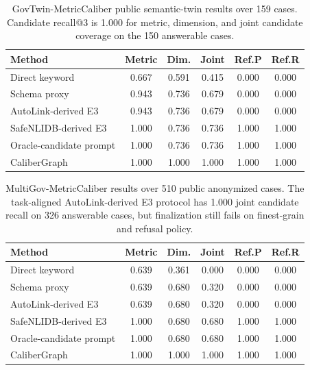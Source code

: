 \documentclass[letterpaper]{article}
\begin{document}
\begin{table}[h]
\centering
\scriptsize
\begin{tabular}{lccccc}
\toprule
Method & Metric & Dim. & Joint & Ref.P & Ref.R \\
\midrule
Direct keyword & 0.667 & 0.591 & 0.415 & 0.000 & 0.000 \\
Schema proxy & 0.943 & 0.736 & 0.679 & 0.000 & 0.000 \\
AutoLink-derived E3 & 0.943 & 0.736 & 0.679 & 0.000 & 0.000 \\
SafeNLIDB-derived E3 & 1.000 & 0.736 & 0.736 & 1.000 & 1.000 \\
Oracle-candidate prompt & 1.000 & 0.736 & 0.736 & 1.000 & 1.000 \\
CaliberGraph & 1.000 & 1.000 & 1.000 & 1.000 & 1.000 \\
\bottomrule
\end{tabular}
\caption{GovTwin-MetricCaliber public semantic-twin results over 159 cases. Candidate recall@3 is 1.000 for metric, dimension, and joint candidate coverage on the 150 answerable cases.}
\end{table}

\begin{table}[h]
\centering
\scriptsize
\begin{tabular}{lccccc}
\toprule
Method & Metric & Dim. & Joint & Ref.P & Ref.R \\
\midrule
Direct keyword & 0.639 & 0.361 & 0.000 & 0.000 & 0.000 \\
Schema proxy & 0.639 & 0.680 & 0.320 & 0.000 & 0.000 \\
AutoLink-derived E3 & 0.639 & 0.680 & 0.320 & 0.000 & 0.000 \\
SafeNLIDB-derived E3 & 1.000 & 0.680 & 0.680 & 1.000 & 1.000 \\
Oracle-candidate prompt & 1.000 & 0.680 & 0.680 & 1.000 & 1.000 \\
CaliberGraph & 1.000 & 1.000 & 1.000 & 1.000 & 1.000 \\
\bottomrule
\end{tabular}
\caption{MultiGov-MetricCaliber results over 510 public anonymized cases. The task-aligned AutoLink-derived E3 protocol has 1.000 joint candidate recall on 326 answerable cases, but finalization still fails on finest-grain and refusal policy.}
\end{table}
\end{document}
